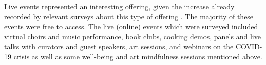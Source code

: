 \documentclass{egpubl}
\begin{document}
Live events represented an interesting offering, given the increase already recorded by relevant surveys about this type of offering \cite{InternationalCouncilofMuseums2020b}. The majority of these events were free to access. The live (online) events which were surveyed included virtual choirs and music performance, book clubs, cooking demos, panels and live talks with curators and guest speakers, art sessions, and webinars on the COVID-19 crisis as well as some well-being and art mindfulness sessions mentioned above.







 



\end{document}
